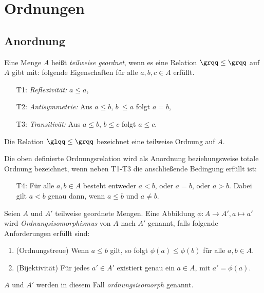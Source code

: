 \section{Ordnungen}
\subsection{Anordnung}
\begin{defn}\label{defgs} 
Eine Menge $A$ heißt \textit{teilweise geordnet}, wenn es eine Relation $ \grqq\leq\grqq $ auf $A$ gibt mit: folgende Eigenschaften für alle $ a,b,c \in A$  erfüllt.
%
\begin{enumerate}
\item[T1:] \textit{Reflexivität: } $a \leq  a$,
\item[T2:] \textit{Antisymmetrie: } Aus $a \leq  b$, $b~ \leq a$ folgt $a = b$,
\item[T3:] \textit{Transitivät: } Aus $a \leq b$, $b \leq c$ folgt $a \leq c$.
\end{enumerate}
%
Die Relation $\glqq \leq\grqq$ bezeichnet eine teilweise Ordnung auf $A$.
\end{defn}
Die oben definierte Ordnungsrelation wird als Anordnung beziehungsweise totale Ordnung bezeichnet, wenn neben T1-T3 die anschließende Bedingung erfüllt ist:
%
\begin{enumerate}
\item[T4:] Für alle $a, b \in A$ besteht entweder $a < b$, oder $a = b$, oder $a > b$. Dabei gilt $a < b$ genau dann, wenn $a \leq b$ und $a\neq b$. 
\end{enumerate}
%
\begin{defn}\label{ordnungsisomorph}
Seien $A$ und $A'$ teilweise geordnete Mengen. Eine Abbildung $\phi \colon A \rightarrow A', a \mapsto a'$ wird \textit{Ordnungsisomorphismus} von $A$ nach $A'$ genannt, falls folgende Anforderungen erfüllt sind:
\begin{enumerate}
\item (Ordnungstreue) Wenn $a \leq b$ gilt, so folgt $\phi(a) \leq \phi(b)$ für alle $a, b  \in A$.
\item (Bijektivität) Für jedes $a' \in A'$ existiert genau ein $a \in A$, mit $a' = \phi(a)$.
\end{enumerate}
$A$ und $A'$ werden in diesem Fall \textit{ordnungsisomorph} genannt.
\end{defn}
